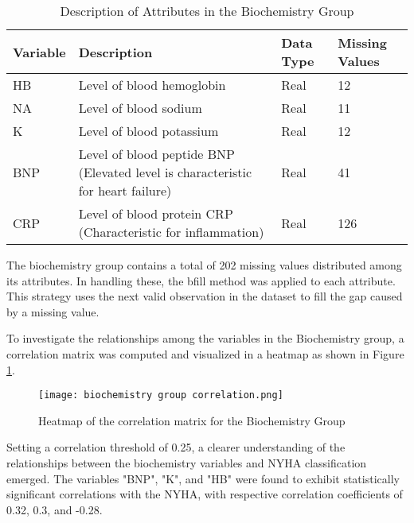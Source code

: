      \begin{table}[H]
        \centering
        \caption{Description of Attributes in the Biochemistry Group}
        \label{tab:biochemistry group attributes}
        \begin{adjustbox}{center}
        \begin{tabular}{|p{2cm}|p{10cm}|p{1.8cm}|p{1.8cm}|}
        \hline
        \textbf{Variable} & \textbf{Description} & \textbf{Data Type} & \textbf{Missing Values} \\ \hline
        HB & Level of blood hemoglobin & Real & 12 \\
        NA & Level of blood sodium & Real & 11\\
        K & Level of blood potassium & Real & 12 \\
        BNP & Level of blood peptide BNP (Elevated level is characteristic for heart failure) & Real & 41 \\
        CRP & Level of blood protein CRP (Characteristic for inflammation) & Real & 126 \\ \hline
        \end{tabular}
        \end{adjustbox}
      \end{table}

      The biochemistry group contains a total of 202 missing values distributed among its attributes. In handling these, the bfill method was applied to each attribute. This strategy uses the next valid observation in the dataset to fill the gap caused by a missing value.

      To investigate the relationships among the variables in the Biochemistry group, a correlation matrix was computed and visualized in a heatmap as shown in Figure \ref{fig:biochemistry group heatmap}.

      \begin{figure}[H]
        \texttt{[image: biochemistry group correlation.png]}
        \caption{Heatmap of the correlation matrix for the Biochemistry Group}
        \label{fig:biochemistry group heatmap}
      \end{figure}

      Setting a correlation threshold of 0.25, a clearer understanding of the relationships between the biochemistry variables and NYHA classification emerged. The variables "BNP", "K", and "HB" were found to exhibit statistically significant correlations with the NYHA, with respective correlation coefficients of 0.32, 0.3, and -0.28.

